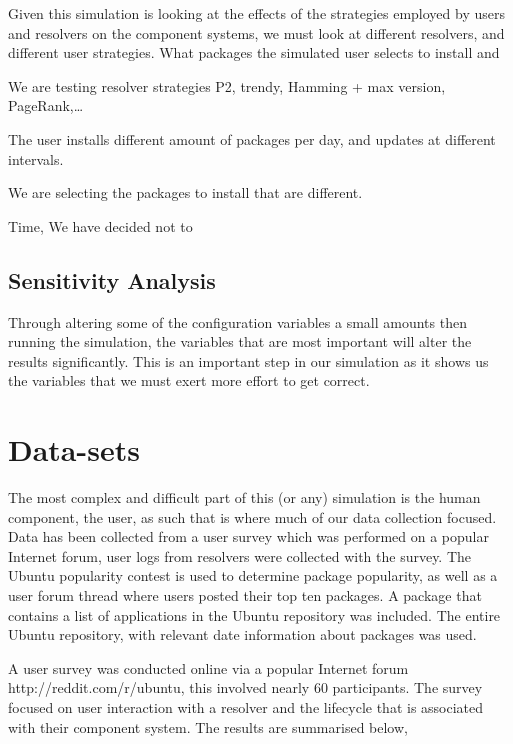 Given this simulation is looking at the effects of the strategies employed by users and resolvers on the component systems,
we must look at different resolvers, and different user strategies.
What packages the simulated user selects to install and 

We are testing resolver strategies P2, trendy, Hamming + max version, PageRank,\ldots 

The user installs different amount of packages per day, and updates at different intervals. 

We are selecting the packages to install that are different.

Time, We have decided not to 

\subsection{Sensitivity Analysis}
{}Through altering some of the configuration variables a small amounts then running the simulation, the variables that are most important will alter the results significantly.
{}This is an important step in our simulation as it shows us the variables that we must exert more effort to get correct. 

\section{Data-sets}
The most complex and difficult part of this (or any) simulation is the human component, the user,
as such that is where much of our data collection focused.
Data has been collected from
a user survey which was performed on a popular Internet forum,
user logs from resolvers were collected with the survey.
The Ubuntu popularity contest is used to determine package popularity,
as well as a user forum thread where users posted their top ten packages.
A package that contains a list of applications in the Ubuntu repository was included.
The entire Ubuntu repository, with relevant date information about packages was used.

A user survey was conducted online via a popular Internet forum http://reddit.com/r/ubuntu, this involved nearly 60 participants. %
The survey focused on user interaction with a resolver and the lifecycle that is associated with their component system.
The results are summarised below, %

